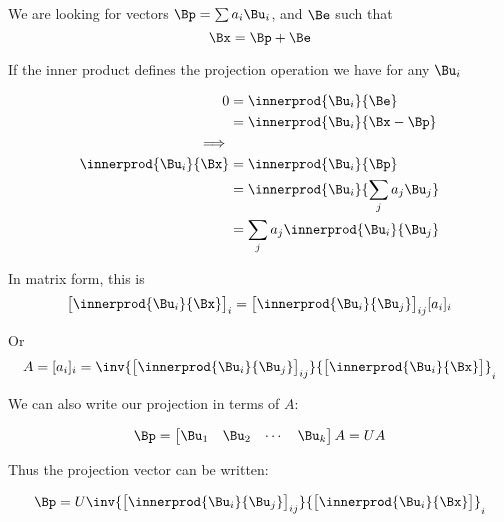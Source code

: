 \documentclass{article}      %
\begin{document}
We are looking for vectors $\Bp = \sum a_i \Bu_i$, and $\Be$ such that
\[
\Bx = \Bp + \Be
\]

If the inner product defines the projection operation we have for any $\Bu_i$

\begin{align*}
0 &= \innerprod{\Bu_i}{\Be} \\
  &= \innerprod{\Bu_i}{\Bx - \Bp} \\
\implies \\
\innerprod{\Bu_i}{\Bx} &= \innerprod{\Bu_i}{\Bp} \\
                       &= \innerprod{\Bu_i}{\sum_j a_j \Bu_j} \\
                       &= \sum_j a_j \innerprod{\Bu_i}{\Bu_j} \\
\end{align*}

In matrix form, this is
\begin{equation*}
{
\begin{bmatrix}
\innerprod{\Bu_i}{\Bx}
\end{bmatrix}
}_i
=
{
\begin{bmatrix}
\innerprod{\Bu_i}{\Bu_j}
\end{bmatrix}
}_{ij}
[a_i]_i
\end{equation*}

Or
\begin{equation*}
A = [a_i]_i = 
\inv{
   {
   \begin{bmatrix}
   \innerprod{\Bu_i}{\Bu_j}
   \end{bmatrix}
   }_{ij}
}
{
\begin{bmatrix}
\innerprod{\Bu_i}{\Bx}
\end{bmatrix}
}_i
\end{equation*}

We can also write our projection in terms of $A$:

\begin{equation*}
\Bp = 
\begin{bmatrix}
\Bu_1 & \Bu_2 & \cdots & \Bu_k
\end{bmatrix}
A
= U A
\end{equation*}

Thus the projection vector can be written:

\begin{equation*}
\Bp = U 
\inv{
   {
   \begin{bmatrix}
   \innerprod{\Bu_i}{\Bu_j}
   \end{bmatrix}
   }_{ij}
}
{
\begin{bmatrix}
\innerprod{\Bu_i}{\Bx}
\end{bmatrix}
}_i
\end{equation*}
\end{document}
